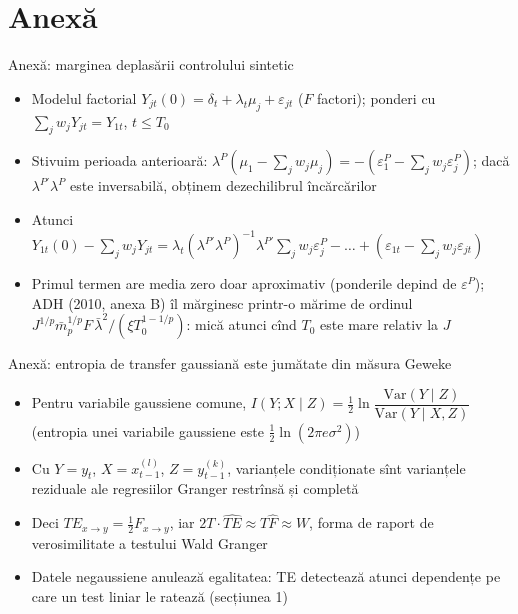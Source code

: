 \section{Anexă}

\begin{frame}{Anexă: marginea deplasării controlului sintetic}
\hypertarget{atsapp1}{}
\itemsize{\small}
\begin{itemize}
    \item Modelul factorial $Y_{jt}(0) = \delta_t + \lambda_t\mu_j + \varepsilon_{jt}$ ($F$ factori); ponderi cu $\sum_jw_jY_{jt} = Y_{1t}$, $t \le T_0$
    \item Stivuim perioada anterioară: $\lambda^P(\mu_1 - \sum_jw_j\mu_j) = -(\varepsilon^P_1 - \sum_jw_j\varepsilon^P_j)$; dacă $\lambda^{P\prime}\lambda^P$ este inversabilă, obținem dezechilibrul încărcărilor
    \item Atunci $Y_{1t}(0) - \sum_jw_jY_{jt} = \lambda_t(\lambda^{P\prime}\lambda^P)^{-1}\lambda^{P\prime}\sum_jw_j\varepsilon^P_j - \dots + (\varepsilon_{1t} - \sum_jw_j\varepsilon_{jt})$
    \item Primul termen are media zero doar aproximativ (ponderile depind de $\varepsilon^P$); ADH (2010, anexa B) îl mărginesc printr-o mărime de ordinul $J^{1/p}\bar m_p^{1/p}F\,\bar\lambda^2/(\xi T_0^{1 - 1/p})$: mică atunci cînd $T_0$ este mare relativ la $J$
\end{itemize}
\end{frame}

\begin{frame}{Anexă: entropia de transfer gaussiană este jumătate din măsura Geweke}
\hypertarget{atsapp2}{}
\itemsize{\small}
\begin{itemize}
    \item Pentru variabile gaussiene comune, $I(Y; X\mid Z) = \frac12\ln\dfrac{\mathrm{Var}(Y\mid Z)}{\mathrm{Var}(Y\mid X, Z)}$ (entropia unei variabile gaussiene este $\frac12\ln(2\pi e\sigma^2)$)
    \item Cu $Y = y_t$, $X = x^{(l)}_{t-1}$, $Z = y^{(k)}_{t-1}$, varianțele condiționate sînt varianțele reziduale ale regresiilor Granger restrînsă și completă
    \item Deci $TE_{x\to y} = \frac12F_{x\to y}$, iar $2T\cdot\widehat{TE} \approx T\hat F \approx W$, forma de raport de verosimilitate a testului Wald Granger 
    \item Datele negaussiene anulează egalitatea: TE detectează atunci dependențe pe care un test liniar le ratează (secțiunea 1)
\end{itemize}
\end{frame}


